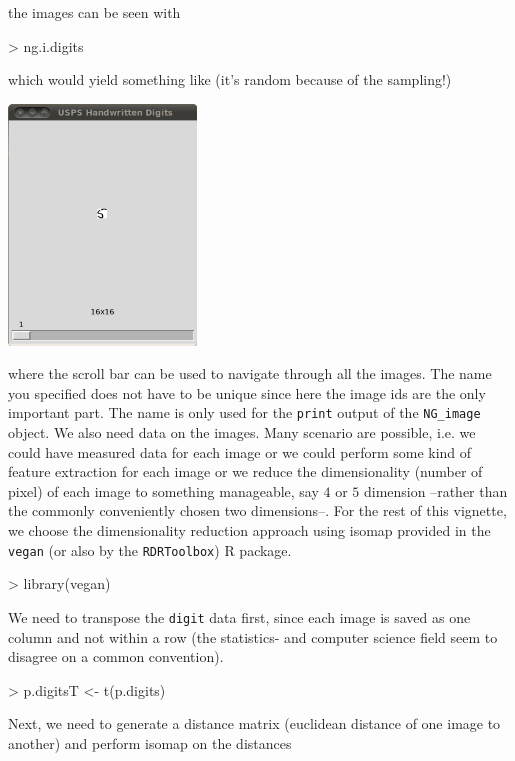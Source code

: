 \documentclass[12pt,oneside,titlepage,letter]{article}
\newcommand{\modify}[1]{{\color{blue}#1}}
\begin{document}
the images can be seen with
\begin{Schunk}
\begin{Sinput}
> ng.i.digits
\end{Sinput}
\end{Schunk}
which would yield something like (it's random because of the sampling!)
\begin{center}
  \includegraphics[width = 5cm]{img/tk2dimages1.png}
\end{center}
where the scroll bar can be used to navigate through all the images. The name you specified does not have to be unique since here the image ids are the only important part. \modify{The name is only used for the \texttt{print} output of the \texttt{NG\_image} object}. We also need data on the images. Many scenario are possible, i.e. we could have measured data for each image or we could perform some kind of feature extraction for each image or we reduce the dimensionality (number of pixel) of each image to something manageable, say $4$ or $5$ dimension --rather than the commonly conveniently chosen two dimensions--. For the rest of this vignette, we choose the dimensionality reduction approach using isomap provided in the \texttt{vegan} (or also by the \texttt{RDRToolbox}) R package. 
\begin{Schunk}
\begin{Sinput}
> library(vegan)
\end{Sinput}
\end{Schunk}
We need to transpose the \texttt{digit} data first, since each image is saved as one column and not within a row (the statistics- and computer science field seem to disagree on a common convention).
\begin{Schunk}
\begin{Sinput}
> p.digitsT <- t(p.digits)
\end{Sinput}
\end{Schunk}
Next, we need to generate a distance matrix (euclidean distance of one image to another) and perform isomap on the distances
\end{document}

